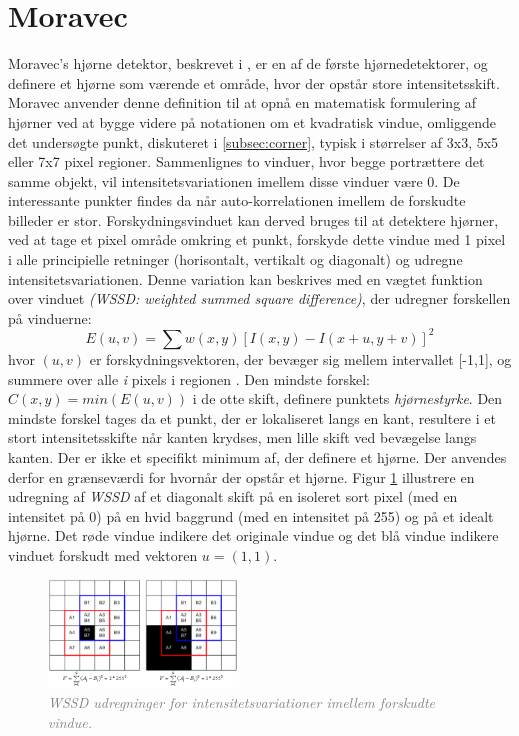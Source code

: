\section{Moravec}\label{sec:moravec}
Moravec's hjørne detektor, beskrevet i \cite{moravec}, er en af de første hjørnedetektorer, og definere et hjørne som værende et område, hvor der opstår store intensitetsskift. Moravec anvender denne definition til at opnå en matematisk formulering af hjørner ved at bygge videre på notationen om et kvadratisk vindue, omliggende det undersøgte punkt, diskuteret i \ref{subsec:corner}, typisk i størrelser af 3x3, 5x5 eller 7x7 pixel regioner. Sammenlignes to vinduer, hvor begge portrættere det samme objekt, vil intensitetsvariationen imellem disse vinduer være 0.
De interessante punkter findes da når auto-korrelationen imellem de forskudte billeder er stor. Forskydningsvinduet kan derved bruges til at detektere hjørner, ved at tage et pixel område omkring et punkt, forskyde dette vindue med 1 pixel i alle principielle retninger (horisontalt, vertikalt og diagonalt) og udregne intensitetsvariationen. Denne variation kan beskrives med en vægtet funktion over vinduet  \emph{(WSSD: weighted summed square difference)}, der udregner forskellen på vinduerne:
\begin{equation}
E(u,v)= \sum w(x,y)[I(x,y)-I(x+u,y+v)]^2     
\end{equation}
hvor $(u,v)$ er forskydningsvektoren, der bevæger sig mellem intervallet [-1,1], og summere over alle \textit{i} pixels i regionen . Den mindste forskel: $C(x,y)=min(E(u,v))$ i de otte skift, definere punktets \textit{hjørnestyrke}. Den mindste forskel tages da et punkt, der er lokaliseret langs en kant, resultere i et stort intensitetsskifte når kanten krydses, men lille skift ved bevægelse langs kanten. Der er ikke et specifikt minimum af, der definere et hjørne. Der anvendes derfor en grænseværdi for hvornår der opstår et hjørne. Figur \ref{fig:moravec} illustrere en udregning af \textit{WSSD} af et diagonalt skift på en isoleret sort pixel (med en intensitet på 0) på en hvid baggrund (med en intensitet på 255) og på et idealt hjørne. Det røde vindue indikere det originale vindue og det blå vindue indikere  vinduet forskudt med vektoren $u = (1,1)$. 
\begin{figure}[H]
    \centering
    \includegraphics[width=0.45\textwidth]{fig/25.png}
     \vspace{-1em}
    \begin{center}    
       \caption{\textcolor{gray}{\footnotesize \textit{ WSSD udregninger for intensitetsvariationer imellem forskudte vindue. }}}
    \label{fig:moravec}
     \end{center}
     \vspace{-2.5em}
  \end{figure} \noindent
